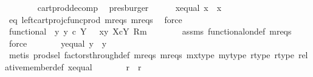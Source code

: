 \begin{isabellebody}
\ \ \ \ \ \ \isamarkupfalse%
\ cart{\isacharunderscore}{\kern0pt}prod{\isacharunderscore}{\kern0pt}decomp\ \isamarkupfalse%
\ presburger\isanewline
\ \ \ \ \isamarkupfalse%
\ x{\isacharunderscore}{\kern0pt}equal{\isacharcolon}{\kern0pt}\ {\isachardoublequoteopen}x{}\ {\isacharequal}{\kern0pt}\ x{}{\isachardoublequoteclose}\isanewline
\ \ \ \ \ \ \isamarkupfalse%
\ eq\ left{\isacharunderscore}{\kern0pt}cart{\isacharunderscore}{\kern0pt}proj{\isacharunderscore}{\kern0pt}cfunc{\isacharunderscore}{\kern0pt}prod\ m{}r{}{\isacharunderscore}{\kern0pt}eqs\ m{}r{}{\isacharunderscore}{\kern0pt}eqs\ \isamarkupfalse%
\ force\isanewline
\ \ \ \ \isamarkupfalse%
\ functional{\isacharcolon}{\kern0pt}\ {\isachardoublequoteopen}{\isasymexists}{\isacharbang}{\kern0pt}\ y{\isachardot}{\kern0pt}\ {\isacharparenleft}{\kern0pt}y\ {\isasymin}\isactrlsub c\ Y\ {\isasymand}\ \ {\isasymlangle}x{}{\isacharcomma}{\kern0pt}y{\isasymrangle}\ {\isasymin}\isactrlbsub X{\isasymtimes}\isactrlsub cY\isactrlesub \ {\isacharparenleft}{\kern0pt}R{\isacharcomma}{\kern0pt}m{\isacharparenright}{\kern0pt}{\isacharparenright}{\kern0pt}{\isachardoublequoteclose}\isanewline
\ \ \ \ \ \ \isamarkupfalse%
\ assms\ functional{\isacharunderscore}{\kern0pt}on{\isacharunderscore}{\kern0pt}def\ m{}r{}{\isacharunderscore}{\kern0pt}eqs\ \isamarkupfalse%
\ force\isanewline
\ \ \ \ \isamarkupfalse%
\ \isamarkupfalse%
\ y{\isacharunderscore}{\kern0pt}equal{\isacharcolon}{\kern0pt}\ {\isachardoublequoteopen}y{}\ {\isacharequal}{\kern0pt}\ y{}{\isachardoublequoteclose}\isanewline
\ \ \ \ \ \ \isamarkupfalse%
\ {\isacharparenleft}{\kern0pt}metis\ prod{\isachardot}{\kern0pt}sel\ factors{\isacharunderscore}{\kern0pt}through{\isacharunderscore}{\kern0pt}def{}\ m{}r{}{\isacharunderscore}{\kern0pt}eqs\ m{}r{}{\isacharunderscore}{\kern0pt}eqs\ mx{\isacharunderscore}{\kern0pt}type\ my{\isacharunderscore}{\kern0pt}type\ r{}{\isacharunderscore}{\kern0pt}type\ r{}{\isacharunderscore}{\kern0pt}type\ relative{\isacharunderscore}{\kern0pt}member{\isacharunderscore}{\kern0pt}def\ x{\isacharunderscore}{\kern0pt}equal{\isacharparenright}{\kern0pt}\isanewline
\ \ \ \ \isamarkupfalse%
\ \isamarkupfalse%
\ {\isachardoublequoteopen}r{}\ {\isacharequal}{\kern0pt}\ r{}{\isachardoublequoteclose}\isanewline

\end{isabellebody}
